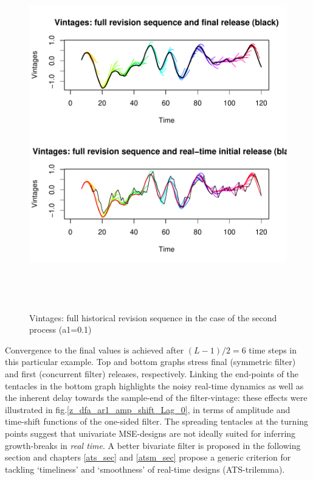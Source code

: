 \documentclass[a4paper]{book}
\begin{document}
\begin{enumerate}
\begin{figure}[H]\begin{center}\includegraphics[height=6in, width=6in]{z_vintages_2.pdf}\caption{Vintages: full historical revision sequence in the case of the second  process (a1=0.1)\label{z_vintages_2}}\end{center}\end{figure}Convergence to the final values is achieved after $(L-1)/2=6$ time steps in this particular example. Top and bottom graphs stress final (symmetric filter) and first (concurrent filter) releases, respectively. Linking the end-points of the tentacles in the bottom graph highlights the noisy real-time dynamics as well as the inherent delay towards the sample-end of the filter-vintage: these effects were illustrated in fig.\ref{z_dfa_ar1_amp_shift_Lag_0}, in terms of amplitude and time-shift functions of the one-sided filter. The spreading tentacles at the turning points  suggest that univariate MSE-designs are not ideally suited for inferring growth-breaks in \emph{real time}. A better bivariate filter is proposed in the following section and chapters \ref{ats_sec} and \ref{atsm_sec} propose a generic criterion for tackling `timeliness' and `smoothness' of real-time designs (ATS-trilemma).
\end{enumerate}
\end{document}
